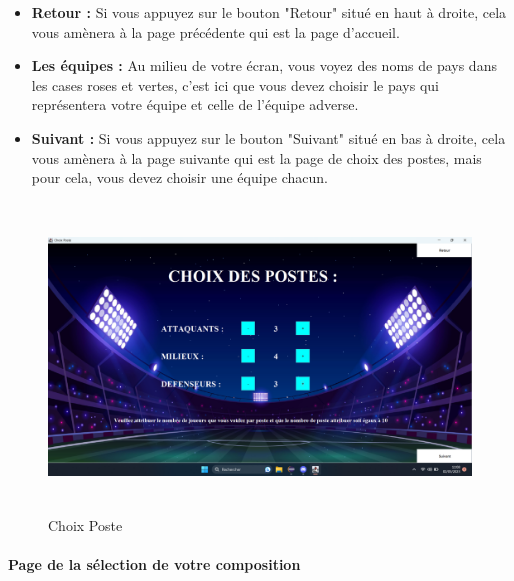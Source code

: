\begin{itemize}
    \item \textbf{Retour :} 
        Si vous appuyez sur le bouton "Retour" situé en haut à droite, cela vous amènera à la page précédente qui est la page d'accueil.

    \vspace{15pt}

    \item \textbf{Les équipes :} 
        Au milieu de votre écran, vous voyez des noms de pays dans les cases roses et vertes, c'est ici que vous devez choisir le pays qui représentera votre équipe et celle de l'équipe adverse.

    \vspace{15pt}

    \item \textbf{Suivant :} 
        Si vous appuyez sur le bouton "Suivant" situé en bas à droite, cela vous amènera à la page suivante qui est la page de choix des postes, mais pour cela, vous devez choisir une équipe chacun.
        
    \vspace{15pt}
\end{itemize}

\begin{figure}[h]
\centering
\includegraphics[width=12.82cm, height=8.2cm]{images/ChoixPoste.png}
\caption{Choix Poste}
\label{fig:choixPoste}
\end{figure}

    \vspace{15pt}

\paragraph{Page de la sélection de votre composition}

